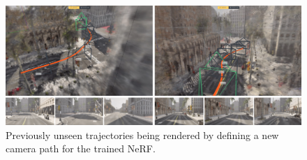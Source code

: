 \begin{figure}[h]
    \centering
    \includegraphics[width=1.0\textwidth]{figures/unseen-trajectories-v2.png}
    \caption{Previously unseen trajectories being rendered by defining a new camera path for the trained NeRF.}
    \label{fig:unseen-trajectories-v2}
\end{figure}